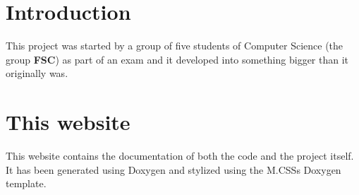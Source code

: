  \hypertarget{index_intro_sec}{}\section{Introduction}\label{index_intro_sec}
This project was started by a group of five students of Computer Science (the group {\bfseries{F\+SC}}) as part of an exam and it developed into something bigger than it originally was.\hypertarget{index_the_website}{}\section{This website}\label{index_the_website}
This website contains the documentation of both the code and the project itself. It has been generated using Doxygen and stylized using the M.\+C\+SS\textquotesingle{}s Doxygen template. 